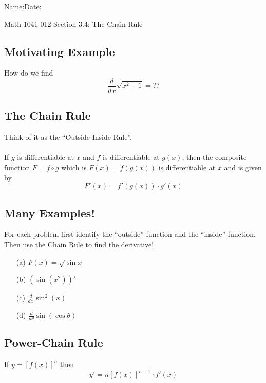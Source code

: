 \documentclass[12pt]{book}
\theoremstyle{definition}
\begin{document}
\begin{flushleft}
Name:\underline{\hspace{13cm}}Date:\underline{\hspace{2cm}}
\end{flushleft}
\begin{center}
{\Large Math 1041-012 \hspace{0.5cm} Section 3.4: The Chain Rule}
\end{center}
\subsection*{Motivating Example}
How do we find
\[
\frac{d}{dx}\sqrt{x^2+1}=??
\]
\vspace{2cm}
\begin{tcolorbox}
\subsection*{The Chain Rule}
Think of it as the ``Outside-Inside Rule''.\\ \\
If $g$ is differentiable at $x$ and $f$ is differentiable at $g(x)$, then the composite function $F=f\circ g$ which is $F(x)=f(g(x))$ is differentiable at $x$ and is given by
\[
F'(x)=f'(g(x))\cdot g'(x)
\]
\vspace{2cm}
\end{tcolorbox}
\subsection*{Many Examples!}
For each problem first identify the ``outside'' function and the ``inside'' function. Then use the Chain Rule to find the derivative!
\begin{itemize}
    \item[(a)] $F(x)=\sqrt{\sin x}$\vspace{3cm}
    \item[(b)] $(\sin(x^2))'$\vspace{3cm}
    \item[(c)] $\frac{d}{dx}\sin^2(x)$\vspace{3cm}
    \item[(d)] $\frac{d}{d\theta}\sin(\cos\theta)$\vspace{3cm}
\end{itemize}
\begin{tcolorbox}
\subsection*{Power-Chain Rule} If $y=[f(x)]^n$ then
\[
y'=n[f(x)]^{n-1}\cdot f'(x)
\]
\end{tcolorbox}
\end{document}
